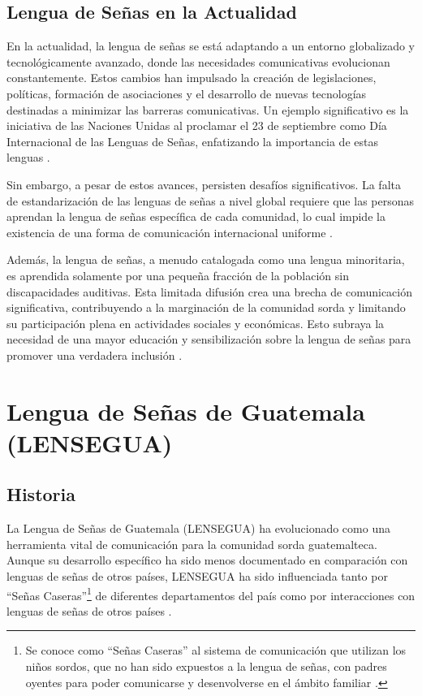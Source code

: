 \subsection{Lengua de Señas en la Actualidad}
En la actualidad, la lengua de señas se está adaptando a un entorno globalizado y tecnológicamente avanzado, donde las necesidades comunicativas evolucionan constantemente. Estos cambios han impulsado la creación de legislaciones, políticas, formación de asociaciones y el desarrollo de nuevas tecnologías destinadas a minimizar las barreras comunicativas. Un ejemplo significativo es la iniciativa de las Naciones Unidas al proclamar el 23 de septiembre como Día Internacional de las Lenguas de Señas, enfatizando la importancia de estas lenguas \cite{Parada2022}.

Sin embargo, a pesar de estos avances, persisten desafíos significativos. La falta de estandarización de las lenguas de señas a nivel global requiere que las personas aprendan la lengua de señas específica de cada comunidad, lo cual impide la existencia de una forma de comunicación internacional uniforme \cite{RuizVilla2022}.

Además, la lengua de señas, a menudo catalogada como una lengua minoritaria, es aprendida solamente por una pequeña fracción de la población sin discapacidades auditivas. Esta limitada difusión crea una brecha de comunicación significativa, contribuyendo a la marginación de la comunidad sorda y limitando su participación plena en actividades sociales y económicas. Esto subraya la necesidad de una mayor educación y sensibilización sobre la lengua de señas para promover una verdadera inclusión \cite{MelendezLabrador2021}.

\section{Lengua de Señas de Guatemala (LENSEGUA)}

\subsection{Historia}
La Lengua de Señas de Guatemala (LENSEGUA) ha evolucionado como una herramienta vital de comunicación para la comunidad sorda guatemalteca. Aunque su desarrollo específico ha sido menos documentado en comparación con lenguas de señas de otros países, LENSEGUA ha sido influenciada tanto por ``Señas Caseras''\footnote{Se conoce como ``Señas Caseras'' al sistema de comunicación que utilizan los niños sordos, que no han sido expuestos a la lengua de señas, con padres oyentes para poder comunicarse y desenvolverse en el ámbito familiar \cite{EnSenasCultura}.} de diferentes departamentos del país como por interacciones con lenguas de señas de otros países \cite{Aroche2022} \cite{EndangeredLanguages}.


